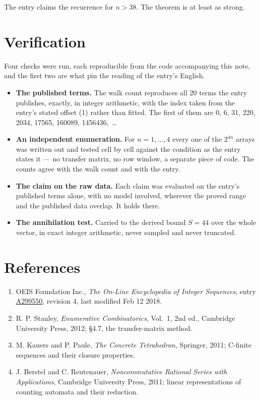 \documentclass[11pt]{article}
\theoremstyle{definition}
\begin{document}
The entry claims the recurrence for $n > 38$. The theorem is at least as strong.

\section{Verification}

Four checks were run, each reproducible from the code accompanying this note, and the first two are what pin the reading of the entry's English.

\begin{itemize}

\item {\bfseries The published terms.} The walk count reproduces all 20 terms the entry publishes, exactly, in integer arithmetic, with the index taken from the entry's stated offset (1) rather than fitted. The first of them are 0, 6, 31, 220, 2034, 17565, 160089, 1456436,~\dots

\item {\bfseries An independent enumeration.} For $n = 1,\dots,4$ every one of the $2^{4n}$ arrays was written out and tested cell by cell against the condition as the entry states it --- no transfer matrix, no row window, a separate piece of code. The counts agree with the walk count and with the entry.

\item {\bfseries The claim on the raw data.} Each claim was evaluated on the entry's published terms alone, with no model involved, wherever the proved range and the published data overlap. It holds there.

\item {\bfseries The annihilation test.} Carried to the derived bound $S = 44$ over the whole vector, in exact integer arithmetic, never sampled and never truncated.

\end{itemize}

\section{References}

\begin{enumerate}

\item OEIS Foundation Inc., \emph{The On-Line Encyclopedia of Integer Sequences}, entry \href{https://oeis.org/A299550}{A299550}, revision 4, last modified Feb 12 2018.

\item R. P. Stanley, \emph{Enumerative Combinatorics}, Vol.~1, 2nd ed., Cambridge University Press, 2012; \S4.7, the transfer-matrix method.

\item M. Kauers and P. Paule, \emph{The Concrete Tetrahedron}, Springer, 2011; C-finite sequences and their closure properties.

\item J. Berstel and C. Reutenauer, \emph{Noncommutative Rational Series with Applications}, Cambridge University Press, 2011; linear representations of counting automata and their reduction.

\end{enumerate}
\end{document}
